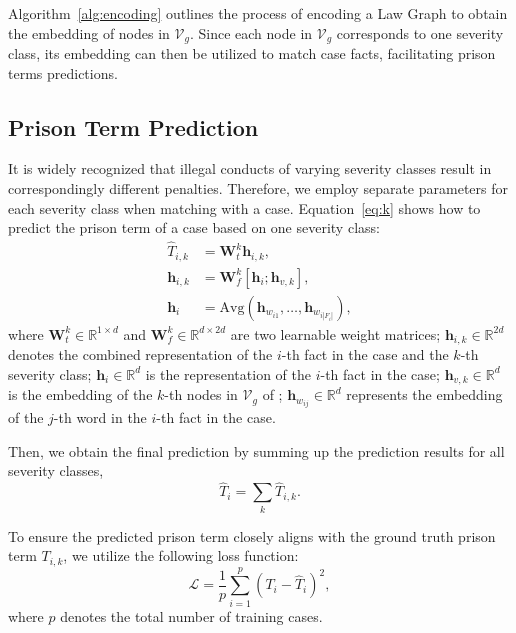 Algorithm~\ref{alg:encoding} outlines the process of encoding a Law Graph to obtain the embedding of nodes in $\mathcal{V}_g$. Since each node in $\mathcal{V}_g$ corresponds to one severity class, its embedding can then be utilized to match case facts, facilitating prison terms predictions.

\subsection{Prison Term Prediction} \label{ee}
It is widely recognized that illegal conducts of varying severity classes result in correspondingly different penalties. Therefore, we employ separate parameters for each severity class when matching with a case. Equation~\ref{eq:k} shows how to predict the prison term of a case based on one severity class:
\begin{align}
\hat{T}_{i,k} &= \textbf{W}^{k}_{t}\mathbf{h}_{i,k}, \label{eq:k} \\
\mathbf{h}_{i,k} &= \textbf{W}^{k}_{f}\left[\mathbf{h}_i; \mathbf{h}_{v,k}\right], \\
\mathbf{h}_i &= \text{Avg}({\mathbf{h}_{w_{i1}},\ldots,\mathbf{h}_{w_{i|F_i|}}}),
\end{align}
\noindent where $\textbf{W}^{k}_{t} \in \mathbb{R}^{1\times d}$ and $\textbf{W}^{k}_{f} \in \mathbb{R}^{d\times 2d}$ are two learnable weight matrices; $\mathbf{h}_{i,k} \in \mathbb{R}^{2d}$ denotes the combined representation of the $i$-th fact in the case and the $k$-th severity class; $\mathbf{h}_i \in \mathbb{R}^{d}$ is the representation of the $i$-th fact in the case; $\mathbf{h}_{v,k} \in \mathbb{R}^{d}$ is the embedding of the $k$-th nodes in $\mathcal{V}_g$ of \lawgraph{}; $\mathbf{h}_{w_{ij}} \in \mathbb{R}^{d}$ represents the embedding of the $j$-th word in the $i$-th fact in the case.

Then, we obtain the final prediction by summing up the prediction results for all severity classes,
\begin{equation}
\hat{T}_{i} = \sum_{k}\hat{T}_{i,k}.
\label{eq:f}
\end{equation}

To ensure the predicted prison term closely aligns with the ground truth prison term ${T}_{i,k}$, we utilize the following loss function:
\begin{equation}
\mathcal{L} = \frac{1}{p}\sum_{i=1}^{p}(T_{i}-\hat{T}_{i})^2,
\label{eq:loss}
\end{equation}
\noindent where $p$ denotes the total number of training cases. 


